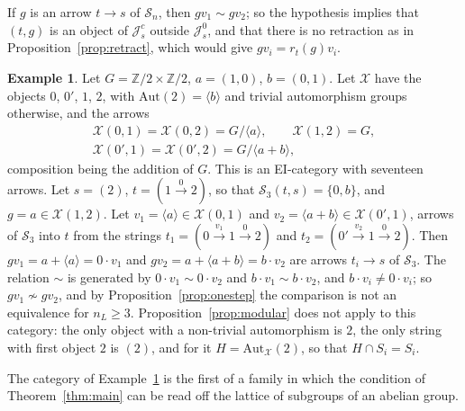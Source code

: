 \documentclass[11pt]{amsart}
\theoremstyle{definition}
\newtheorem{ex}[thm]{Example}
\newcommand{\Aut}{\mathrm{Aut}}
\newcommand{\cX}{\mathcal X}
\newcommand{\cS}{\mathcal S}
\newcommand{\cJ}{\mathcal J}
\begin{document}
If $g$ is an arrow $t\to s$ of $\cS_n$, then $gv_1\sim gv_2$; so the
hypothesis implies that $(t,g)$ is an object of $\cJ^c_s$ outside
$\cJ^0_s$, and that there is no retraction as in
Proposition~\ref{prop:retract}, which would give $gv_i=r_t(g)v_i$.

\begin{ex}\label{ex:top}
Let $G=\mathbb Z/2\times\mathbb Z/2$, $a=(1,0)$, $b=(0,1)$. Let $\cX$
have the objects $0$, $0'$, $1$, $2$, with $\Aut(2)=\langle b\rangle$
and trivial automorphism groups otherwise, and the arrows
\begin{gather*}
\cX(0,1)=\cX(0,2)=G/\langle a\rangle,\qquad\cX(1,2)=G,\\
\cX(0',1)=\cX(0',2)=G/\langle a+b\rangle,
\end{gather*}
composition being the addition of $G$. This is an EI-category with
seventeen arrows. Let $s=(2)$, $t=(1\xrightarrow{0}2)$, so that
$\cS_3(t,s)=\{0,b\}$, and $g=a\in\cX(1,2)$. Let $v_1=\langle a\rangle
\in\cX(0,1)$ and $v_2=\langle a+b\rangle\in\cX(0',1)$, arrows of
$\cS_3$ into $t$ from the strings $t_1=(0\xrightarrow{v_1}1
\xrightarrow{0}2)$ and $t_2=(0'\xrightarrow{v_2}1\xrightarrow{0}2)$.
Then $gv_1=a+\langle a\rangle=0\cdot v_1$ and $gv_2=a+\langle a+b
\rangle=b\cdot v_2$ are arrows $t_i\to s$ of $\cS_3$. The relation
$\sim$ is generated by $0\cdot v_1\sim0\cdot v_2$ and $b\cdot v_1\sim
b\cdot v_2$, and $b\cdot v_i\ne0\cdot v_i$; so $gv_1\not\sim gv_2$,
and by Proposition~\ref{prop:onestep} the comparison is not an
equivalence for $n_L\ge3$. Proposition~\ref{prop:modular} does not
apply to this category: the only object with a non-trivial
automorphism is $2$, the only string with first object $2$ is $(2)$,
and for it $H=\Aut_{\cX}(2)$, so that $H\cap S_i=S_i$.
\end{ex}

The category of Example~\ref{ex:top} is the first of a family in which
the condition of Theorem~\ref{thm:main} can be read off the lattice of
subgroups of an abelian group.
\end{document}
